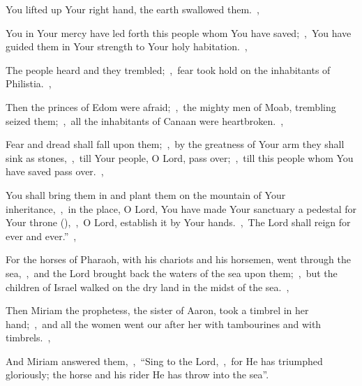 \documentclass[12pt,twoside,a5paper]{article}
\begin{document}
\begin{normalparskip}
  You lifted up Your right hand, the earth swallowed them.~\sep

  You in Your mercy have led forth this people whom You have saved;~\sep\ You have guided them in Your strength to Your holy habitation.~\sep

  The people heard and they trembled;~\sep\ fear took hold on the inhabitants of Philistia.~\sep

  Then the princes of Edom were afraid;~\sep\ the mighty men of Moab, trembling seized them;~\sep\ all the inhabitants of Canaan were heartbroken.~\sep

  Fear and dread shall fall upon them;~\sep\ by the greatness of Your arm they shall sink as stones,~\sep\ till Your people, O Lord, pass over;~\sep\ till this people whom You have saved pass over.~\sep

  You shall bring them in and plant them on the mountain of Your inheritance,~\sep\ in the place, O Lord, You have made Your sanctuary a pedestal for Your throne (),~\sep\ O Lord, establish it by Your hands.~\sep\ The Lord shall reign for ever and ever.''~\sep

  For the horses of Pharaoh, with his chariots and his horsemen, went through the sea,~\sep\ and the Lord brought back the waters of the sea upon them;~\sep\ but the children of Israel walked on the dry land in the midst of the sea.~\sep

  Then Miriam the prophetess, the sister of Aaron, took a timbrel in her hand;~\sep\ and all the women went our after her with tambourines and with timbrels.~\sep

  And Miriam answered them,~\sep\ ``Sing to the Lord,~\sep\ for He has triumphed gloriously; the horse and his rider He has throw into the sea''.
\end{normalparskip}

\end{document}

